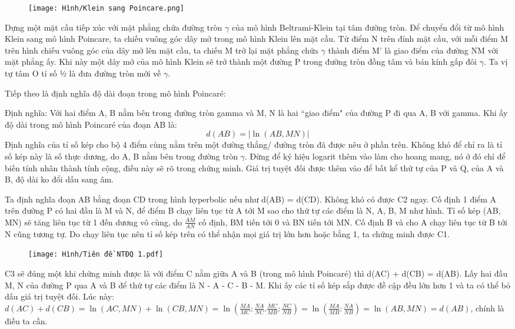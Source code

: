 \begin{multicols}{2}
	\begin{figure}[ht]
		\texttt{[image: Hình/Klein sang Poincare.png]}
	\end{figure}
	
	Dựng một mặt cầu tiếp xúc với mặt phẳng chứa đường tròn $\gamma$ của mô hình Beltrami-Klein tại tâm đường tròn. Để chuyển đổi từ mô hình Klein sang mô hình Poincare, ta chiếu vuông góc dây mở trong mô hình Klein lên mặt cầu. Từ điểm N trên đỉnh mặt cầu, với mỗi điểm M trên hình chiếu vuông góc của dây mở lên mặt cầu, ta chiếu M trở lại mặt phẳng chứa $\gamma$ thành điểm M’ là giao điểm của đường NM với mặt phẳng ấy. Khi này một dây mở của mô hình Klein sẽ trở thành một đường P trong đường tròn đồng tâm và bán kính gấp đôi $\gamma$. Ta vị tự tâm O tỉ số ½ là đưa đường tròn mới về $\gamma$.
	
	Tiếp theo là định nghĩa độ dài đoạn trong mô hình Poincaré:
	
	Định nghĩa: Với hai điểm A, B nằm bên trong đường tròn gamma và M, N là hai ``giao điểm" của đường P đi qua A, B với gamma. Khi ấy độ dài trong mô hình Poincaré của đoạn AB là:
	\[ d(AB) = |\ln{(AB, MN)}| \]
	Định nghĩa của tỉ số kép cho bộ 4 điểm cùng nằm trên một đường thẳng/ đường tròn đã được nêu ở phần trên. Không khó để chỉ ra là tỉ số kép này là số thực dương, do A, B nằm bên trong đường tròn $\gamma$. Đừng để ký hiệu logarit thêm vào làm cho hoang mang, nó ở đó chỉ để biến tính nhân thành tính cộng, điều này sẽ rõ trong chứng minh. Giá trị tuyệt đối được thêm vào để bất kể thứ tự của P và Q, của A và B, độ dài ko đổi dấu sang âm.
	
	Ta định nghĩa đoạn AB bằng đoạn CD trong hình hyperbolic nếu như d(AB) = d(CD). Không khó có được C2 ngay. 
	Cố định 1 điểm A trên đường P có hai đầu là M và N, để điểm B chạy liên tục từ A tới M sao cho thứ tự các điểm là N, A, B, M như hình. Tỉ số kép (AB, MN) sẽ tăng liên tục từ 1 đến dương vô cùng, do $\frac{AM}{AN}$ cố định, BM tiến tới 0 và BN tiến tới MN. Cố định B và cho A chạy liên tục từ B tới N cũng tương tự. Do chạy liên tục nên tỉ số kép trên có thể nhận mọi giá trị lớn hơn hoặc bằng 1, ta chứng minh được C1. 
	
	\begin{figure}[ht]
		\texttt{[image: Hình/Tiên đề NTĐQ 1.pdf]}
	\end{figure}
	
	C3 sẽ đúng một khi chứng minh được là với điểm C nằm giữa A và B (trong mô hình Poincaré) thì d(AC) + d(CB) = d(AB). Lấy hai đầu M, N của đường P qua A và B để thứ tự các điểm là N - A - C - B - M.
	Khi ấy các tỉ số kép sắp được đề cập đều lớn hơn 1 và ta có thể bỏ dấu giá trị tuyệt đối. Lúc này:
	$d(AC) + d(CB) = \ln{(AC, MN)} + \ln{(CB, MN)} = \ln{\left(\frac{MA}{MC} : \frac{NA}{NC} . \frac{MC}{MB} : \frac{NC}{NB} \right)} = \ln{ \left(\frac{MA}{MB} : \frac{NA}{NB}\right)} = \ln{(AB, MN)} = d(AB)$, chính là điều ta cần.
	

\end{multicols}
